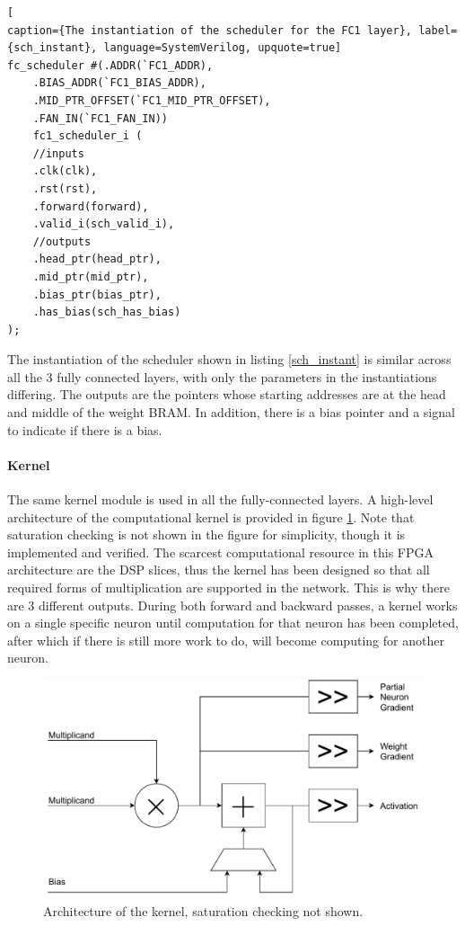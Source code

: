 \begin{lstlisting}[
caption={The instantiation of the scheduler for the FC1 layer}, label={sch_instant}, language=SystemVerilog, upquote=true]
fc_scheduler #(.ADDR(`FC1_ADDR), 
	.BIAS_ADDR(`FC1_BIAS_ADDR),
	.MID_PTR_OFFSET(`FC1_MID_PTR_OFFSET), 
	.FAN_IN(`FC1_FAN_IN)) 
	fc1_scheduler_i (
	//inputs
	.clk(clk),
	.rst(rst),
	.forward(forward),
	.valid_i(sch_valid_i),	
	//outputs
	.head_ptr(head_ptr),
	.mid_ptr(mid_ptr),
	.bias_ptr(bias_ptr),
	.has_bias(sch_has_bias)
);		
\end{lstlisting}
The instantiation of the scheduler shown in listing \ref{sch_instant} is similar across all the 3 fully connected layers, with only the parameters in the instantiations differing. The outputs are the pointers whose starting addresses are at the head and middle of the weight BRAM. In addition, there is a bias pointer and a signal to indicate if there is a bias.


\paragraph{Kernel}
The same kernel module is used in all the fully-connected layers. A high-level architecture of the computational kernel is provided in figure \ref{kernel-arch}. Note that saturation checking is not shown in the figure for simplicity, though it is implemented and verified. The scarcest computational resource in this FPGA architecture are the DSP slices, thus the kernel has been designed so that all required forms of multiplication are supported in the network. This is why there are 3 different outputs. During both forward and backward passes, a kernel works on a single specific neuron until computation for that neuron has been completed, after which if there is still more work to do, will become computing for another neuron.

\begin{figure}
	\centering 
	\includegraphics[width=5in]{figures/kernel_arch}
	\caption{Architecture of the kernel, saturation checking not shown.}\label{kernel-arch}
\end{figure}

